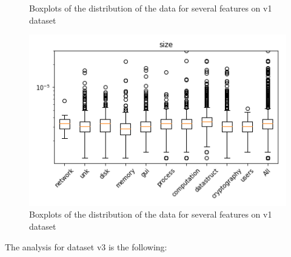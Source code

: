 \begin{appendices}
\begin{figure}[H]
\caption{Boxplots of the distribution of the data for several features on v1 dataset}\label{fig:distribution_analysis3}
\end{figure}




\begin{figure}[H]



%
\centering
\includegraphics[width=0.9\linewidth]{img/boxplots/v1_unbalanced_size.png}
\endminipage


\caption{Boxplots of the distribution of the data for several features on v1 dataset}\label{fig:distribution_analysis4}
\end{figure}



The analysis for dataset v3 is the following:


\end{appendices}
